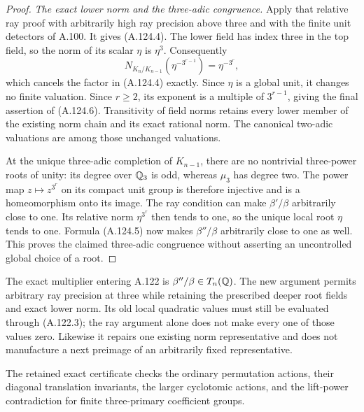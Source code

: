 \begin{proof}
\emph{The exact lower norm and the three-adic congruence.}
Apply that relative ray proof with arbitrarily
high ray precision above three and with the
finite unit detectors of A.100.
It gives (A.124.4).
The lower field has index three in the top
field, so the norm of its scalar \(\eta\)
is \(\eta^3\).
Consequently
\[
 N_{K_n/K_{n-1}}(\eta^{-3^{r-1}})
                         =\eta^{-3^r},
 \tag{A.124.14}
\]
which cancels the factor in (A.124.4) exactly.
Since \(\eta\) is a global unit, it changes
no finite valuation.
Since \(r\ge2\), its exponent is a multiple
of \(3^{r-1}\), giving the final assertion
of (A.124.6).
Transitivity of field norms retains every
lower member of the existing norm chain
and its exact rational norm.
The canonical two-adic valuations are among
those unchanged valuations.

At the unique three-adic completion of
\(K_{n-1}\), there are no nontrivial
three-power roots of unity: its degree
over \(\mathbb Q_3\) is odd, whereas \(\mu_3\)
has degree two.
The power map \(z\mapsto z^{3^r}\) on
its compact unit group is therefore
injective and is a homeomorphism onto
its image.
The ray condition can make
\(\beta'/\beta\) arbitrarily close to one.
Its relative norm \(\eta^{3^r}\) then
tends to one, so the unique local root
\(\eta\) tends to one.
Formula (A.124.5) now makes
\(\beta''/\beta\) arbitrarily close to
one as well.
This proves the claimed three-adic
congruence without asserting an
uncontrolled global choice of a root.
\end{proof}

The exact multiplier entering A.122 is
\(\beta''/\beta\in T_n(\mathbb Q)\).
The new argument permits arbitrary ray
precision at three while retaining the
prescribed deeper root fields and exact
lower norm.
Its old local quadratic values must still
be evaluated through (A.122.3); the ray
argument alone does not make every one
of those values zero.
Likewise it repairs one existing norm
representative and does not manufacture
a next preimage of an arbitrarily fixed
representative.

The retained exact certificate
checks the ordinary permutation actions,
their diagonal translation invariants,
the larger cyclotomic actions, and the
lift-power contradiction for finite
three-primary coefficient groups.
